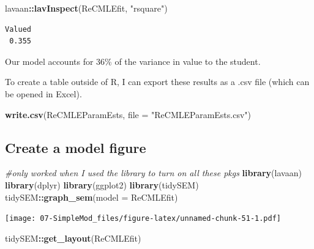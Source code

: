 \documentclass[
  11pt,
]{book}
\newenvironment{Shaded}{\begin{snugshade}}{\end{snugshade}}
\newcommand{\AttributeTok}[1]{\textcolor[rgb]{0.27,0.27,0.27}{#1}}
\newcommand{\CommentTok}[1]{\textcolor[rgb]{0.37,0.37,0.37}{\textit{#1}}}
\newcommand{\FunctionTok}[1]{\textcolor[rgb]{0.27,0.27,0.27}{\textbf{#1}}}
\newcommand{\NormalTok}[1]{#1}
\newcommand{\SpecialCharTok}[1]{\textcolor[rgb]{0.43,0.43,0.43}{\textbf{#1}}}
\newcommand{\StringTok}[1]{\textcolor[rgb]{0.5,0.5,0.5}{#1}}
\begin{document}
\begin{Shaded}
\begin{Highlighting}[]
\NormalTok{lavaan}\SpecialCharTok{::}\FunctionTok{lavInspect}\NormalTok{(ReCMLEfit, }\StringTok{"rsquare"}\NormalTok{)}
\end{Highlighting}
\end{Shaded}

\begin{verbatim}
Valued 
 0.355 
\end{verbatim}

Our model accounts for 36\% of the variance in value to the student.

To create a table outside of R, I can export these results as a .csv file (which can be opened in Excel).

\begin{Shaded}
\begin{Highlighting}[]
\FunctionTok{write.csv}\NormalTok{(ReCMLEParamEsts, }\AttributeTok{file =} \StringTok{"ReCMLEParamEsts.csv"}\NormalTok{)}
\end{Highlighting}
\end{Shaded}

\hypertarget{create-a-model-figure}{%
\subsection*{Create a model figure}\label{create-a-model-figure}}


\begin{Shaded}
\begin{Highlighting}[]
\CommentTok{\#only worked when I used the library to turn on all these pkgs}
\FunctionTok{library}\NormalTok{(lavaan)}
\FunctionTok{library}\NormalTok{(dplyr)}
\FunctionTok{library}\NormalTok{(ggplot2)}
\FunctionTok{library}\NormalTok{(tidySEM)}
\NormalTok{tidySEM}\SpecialCharTok{::}\FunctionTok{graph\_sem}\NormalTok{(}\AttributeTok{model =}\NormalTok{ ReCMLEfit)}
\end{Highlighting}
\end{Shaded}

\texttt{[image: 07-SimpleMod\_files/figure-latex/unnamed-chunk-51-1.pdf]}

\begin{Shaded}
\begin{Highlighting}[]
\NormalTok{tidySEM}\SpecialCharTok{::}\FunctionTok{get\_layout}\NormalTok{(ReCMLEfit)}
\end{Highlighting}
\end{Shaded}
\end{document}
